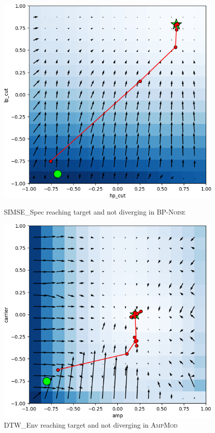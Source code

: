 \documentclass[11pt]{article}
\newcommand{\BPNoise}{\textsc{BP-Noise}}
\newcommand{\AmpMod}{\textsc{AmpMod}}
\begin{document}
\begin{figure}[h]
    \centering
    \begin{minipage}[t]{0.48\textwidth}
        \centering
        \includegraphics[width=\linewidth]{images/experiment_plots/p0_SIMSE_Spec.png}
        \caption{SIMSE\_Spec reaching target and not diverging in \BPNoise}
        \label{fig:p0_simse_iterations}
    \end{minipage}%
    \hfill
    \begin{minipage}[t]{0.48\textwidth}
        \centering
        \includegraphics[width=\linewidth]{images/experiment_plots/p2_DTW_Onset.png}
        \caption{DTW\_Env reaching target and not diverging in \AmpMod}
        \label{fig:p2_dtw_iterations}
    \end{minipage}
\end{figure}
\end{document}
